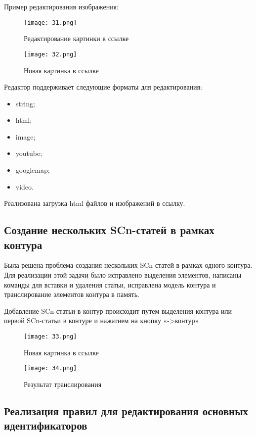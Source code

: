 Пример редактирования изображения:

\begin{figure}[H]
  \centering
  \texttt{[image: 31.png]}
  \caption{Редактирование картинки в ссылке}
  \label{fig:hardware:sdr_pipeline}
\end{figure}


\begin{figure}[H]
  \centering
  \texttt{[image: 32.png]}
  \caption{Новая картинка в ссылке}
  \label{fig:hardware:sdr_pipeline}
\end{figure}


Редактор поддерживает следующие форматы для редактирования:
\begin{itemize}
\item{string;}
\item{html;}
\item{image;}
\item{youtube;}
\item{googlemap;}
\item{video.}
\end{itemize}

Реализована загрузка html файлов и изображений в ссылку.

\newpage
\subsection{Создание нескольких SCn-статей в рамках контура}

Была решена проблема создания нескольких SCn-статей в рамках одного контура. Для реализации этой задачи было исправлено выделения элементов, написаны команды для вставки и удаления статьи, исправлена модель контура и транслирование элементов контура в память.

Добавление SCn-статьи в контур происходит путем выделения контура или первой SCn-статьи в контуре и нажатием на кнопку «->контур»

\begin{figure}[H]
  \centering
  \texttt{[image: 33.png]}
  \caption{Новая картинка в ссылке}
  \label{fig:hardware:sdr_pipeline}
\end{figure}

\begin{figure}[H]
  \centering
  \texttt{[image: 34.png]}
  \caption{Результат транслирования}
  \label{fig:hardware:sdr_pipeline}
\end{figure}

\newpage
\subsection{Реализация правил для редактирования основных идентификаторов}

